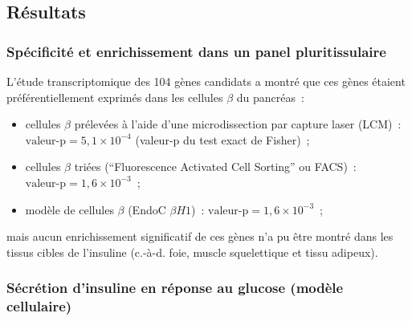 \documentclass[11pt,a4paper,notrimn]{krantz}
\theoremstyle{definition}
\theoremstyle{definition}
\theoremstyle{remark}
\begin{document}
\subsection{Résultats}\label{resultats-1}

\subsubsection{Spécificité et enrichissement dans un panel
pluritissulaire}\label{specificite-et-enrichissement-dans-un-panel-pluritissulaire-1}

L'étude transcriptomique des 104 gènes candidats a montré que ces gènes
étaient préférentiellement exprimés dans les cellules \(\beta\) du
pancréas~:

\begin{itemize}
\item
  cellules \(\beta\) prélevées à l'aide d'une microdissection par
  capture laser (LCM)~: \(\textrm{valeur-p}=5,1\times 10^{-4}\)
  (valeur-p du test exact de Fisher)~;
\item
  cellules \(\beta\) triées (``Fluorescence Activated Cell Sorting'' ou
  FACS)~: \(\textrm{valeur-p}=1,6\times 10^{-3}\)~;
\item
  modèle de cellules \(\beta\) (EndoC \(\beta H1\))~:
  \(\textrm{valeur-p}=1,6\times 10^{-3}\)~;
\end{itemize}

mais aucun enrichissement significatif de ces gènes n'a pu être montré
dans les tissus cibles de l'insuline (c.-à-d. foie, muscle squelettique
et tissu adipeux).

\subsubsection{Sécrétion d'insuline en réponse au glucose (modèle
cellulaire)}\label{secretion-dinsuline-en-reponse-au-glucose-modele-cellulaire-1}
\end{document}
